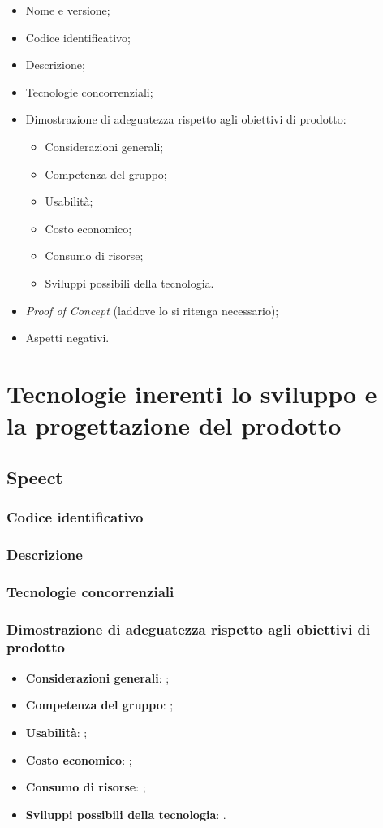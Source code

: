 \documentclass[./../Technology Baseline.tex]{subfiles}
\begin{document}
\begin{itemize}
	\item Nome e versione;
	\item Codice identificativo;
	\item Descrizione;
	\item Tecnologie concorrenziali;
	\item Dimostrazione di adeguatezza rispetto agli obiettivi di prodotto:
	\begin{itemize}
		\item Considerazioni generali;
		\item Competenza del gruppo;
		\item Usabilità;
		\item Costo economico;
		\item Consumo di risorse;
		\item Sviluppi possibili della tecnologia.
	\end{itemize}
	\item \textit{Proof of Concept} (laddove lo si ritenga necessario);
	\item Aspetti negativi.
\end{itemize}

\section{Tecnologie inerenti lo sviluppo e \\ la progettazione del prodotto}

\subsection{Speect}

\subsubsection{Codice identificativo}
\subsubsection{Descrizione}
\subsubsection{Tecnologie concorrenziali}
\subsubsection{Dimostrazione di adeguatezza rispetto agli obiettivi di prodotto}
\begin{itemize}
	\item \textbf{Considerazioni generali}: ;
	\item \textbf{Competenza del gruppo}: ;
	\item \textbf{Usabilità}: ;
	\item \textbf{Costo economico}: ;
	\item \textbf{Consumo di risorse}: ;
	\item \textbf{Sviluppi possibili della tecnologia}: .
\end{itemize}
\end{document}
